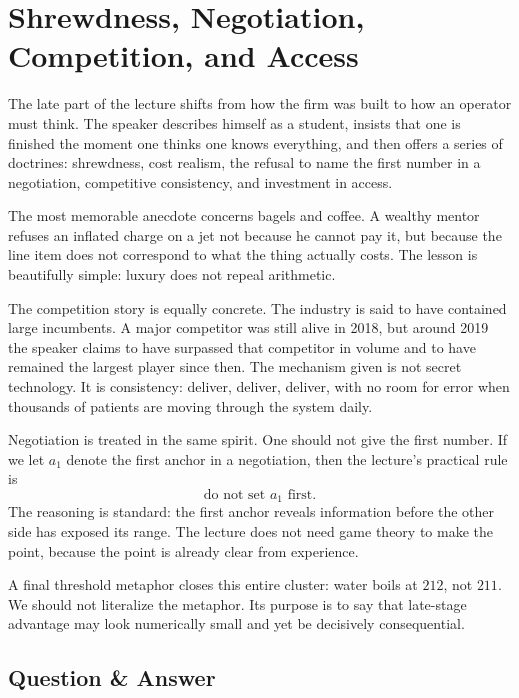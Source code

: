 \section{Shrewdness, Negotiation, Competition, and Access}

The late part of the lecture shifts from how the firm was built to how an operator must think. The speaker describes himself as a student, insists that one is finished the moment one thinks one knows everything, and then offers a series of doctrines: shrewdness, cost realism, the refusal to name the first number in a negotiation, competitive consistency, and investment in access.

The most memorable anecdote concerns bagels and coffee. A wealthy mentor refuses an inflated charge on a jet not because he cannot pay it, but because the line item does not correspond to what the thing actually costs. The lesson is beautifully simple: luxury does not repeal arithmetic.

The competition story is equally concrete. The industry is said to have contained large incumbents. A major competitor was still alive in 2018, but around 2019 the speaker claims to have surpassed that competitor in volume and to have remained the largest player since then. The mechanism given is not secret technology. It is consistency: deliver, deliver, deliver, with no room for error when thousands of patients are moving through the system daily.

Negotiation is treated in the same spirit. One should not give the first number. If we let \(a_1\) denote the first anchor in a negotiation, then the lecture’s practical rule is
\begin{equation}
\text{do not set } a_1 \text{ first.}
\end{equation}
The reasoning is standard: the first anchor reveals information before the other side has exposed its range. The lecture does not need game theory to make the point, because the point is already clear from experience.

A final threshold metaphor closes this entire cluster: water boils at \(212\), not \(211\). We should not literalize the metaphor. Its purpose is to say that late-stage advantage may look numerically small and yet be decisively consequential.

\subsection{Question \& Answer}

